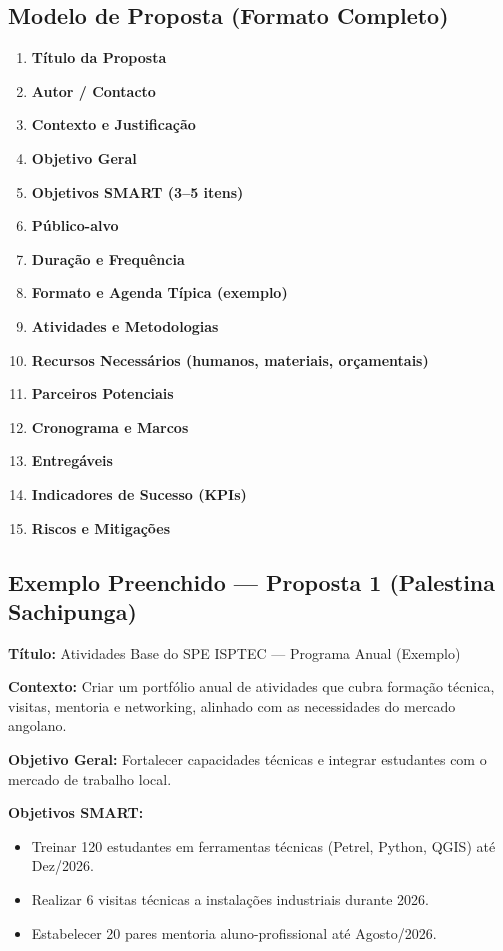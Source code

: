 \documentclass[12pt,a4paper]{article}
\begin{document}
\subsection*{Modelo de Proposta (Formato Completo)}
\begin{enumerate}[leftmargin=1.0cm]
    \item \textbf{Título da Proposta}
    \item \textbf{Autor / Contacto}
    \item \textbf{Contexto e Justificação}
    \item \textbf{Objetivo Geral}
    \item \textbf{Objetivos SMART (3–5 itens)}
    \item \textbf{Público-alvo}
    \item \textbf{Duração e Frequência}
    \item \textbf{Formato e Agenda Típica (exemplo)}
    \item \textbf{Atividades e Metodologias}
    \item \textbf{Recursos Necessários (humanos, materiais, orçamentais)}
    \item \textbf{Parceiros Potenciais}
    \item \textbf{Cronograma e Marcos}
    \item \textbf{Entregáveis}
    \item \textbf{Indicadores de Sucesso (KPIs)}
    \item \textbf{Riscos e Mitigações}
\end{enumerate}

\vspace{0.5cm}
\subsection*{Exemplo Preenchido — Proposta 1 (Palestina Sachipunga)}
\textbf{Título:} Atividades Base do SPE ISPTEC — Programa Anual (Exemplo)

\textbf{Contexto:} Criar um portfólio anual de atividades que cubra formação técnica, visitas, mentoria e networking, alinhado com as necessidades do mercado angolano.

\textbf{Objetivo Geral:} Fortalecer capacidades técnicas e integrar estudantes com o mercado de trabalho local.

\textbf{Objetivos SMART:}
\begin{itemize}
    \item Treinar 120 estudantes em ferramentas técnicas (Petrel, Python, QGIS) até Dez/2026.
    \item Realizar 6 visitas técnicas a instalações industriais durante 2026.
    \item Estabelecer 20 pares mentoria aluno-profissional até Agosto/2026.
\end{itemize}
\end{document}
